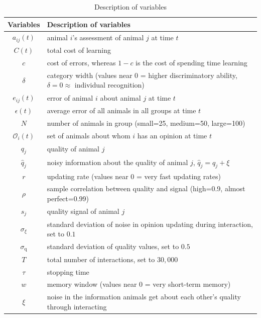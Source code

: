 %
\begin {table}[ht]
\caption {Description of variables} \label{tab:vars} 
\begin{tabular}{cl}

 Variables & Description of variables \\
\midrule 
$a_{ij}(t)$ & animal $i$'s assessment of animal $j$ at time $t$ \\
$C(t)$ & total cost of learning \\ 
$c$ & cost of errors, whereas $1-c$ is the cost of spending time learning \\ 
$\delta$ & category width (values near 0 = higher discriminatory ability, $\delta=0 \approx$ individual recognition)\\
$e_{ij}(t)$ & error of animal $i$ about animal $j$ at time $t$\\
$\epsilon(t)$ & average error of all animals in all groups at time $t$ \\
$N$ & number of animals in group (small=25, medium=50, large=100)\\ 
$\mathscr{O}_i(t)$ & set of animals about whom $i$ has an opinion at time $t$\\
$q_j$ & quality of animal $j$ \\ 
$\hat{q}_j$ & noisy information about the quality of animal $j$, $\hat{q}_j=q_j+\xi$ \\
$r$ & updating rate (values near 0 = very fast updating rates)\\
$\rho$ & sample correlation between quality and signal (high=0.9, almost perfect=0.99)\\
$s_j$ & quality signal of animal $j$ \\ 
$\sigma_\xi$ & standard deviation of noise in opinion updating during interaction, set to $0.1$ \\
$\sigma_\text{q}$ & standard deviation of quality values, set to $0.5$ \\
$T$ & total number of interactions, set to $30,000$ \\
$\tau$ & stopping time \\
$w$ & memory window (values near 0 = very short-term memory)\\
$\xi$ & noise in the information animals get about each other's quality through interacting
\end{tabular}
\end {table}



